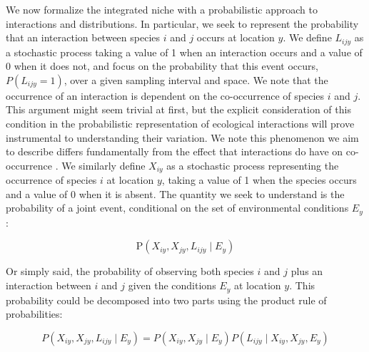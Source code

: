 \documentclass[12pt]{article}
\begin{document}
We now formalize the integrated niche with a probabilistic approach to
interactions and distributions. In particular, we seek to represent the
probability that an interaction between species $i$ and $j$ occurs at location
$y$. We define $L_{ijy}$ as a stochastic process taking a value of 1 when an
interaction occurs and a value of 0 when it does not, and focus on the
probability that this event occurs, $P(L_{ijy} = 1)$, over a given sampling
interval and space. We note that the occurrence of an interaction is dependent
on the co-occurrence of species $i$ and $j$. This argument might seem trivial
at first, but the explicit consideration of this condition in the
probabilistic representation of ecological interactions will prove
instrumental to understanding their variation. We note this phenomenon we aim
to describe differs fundamentally from the effect that interactions do have on
co-occurrence \citep{Cazelles2016}. We similarly define $X_{iy}$ as a
stochastic process representing the occurrence of species $i$ at location
$y$, taking a value of 1 when the species occurs and a value of 0 when it is
absent. The quantity we seek to understand is the probability of a joint
event, conditional on the set of environmental conditions $E_y$:

\begin{equation}
	\text{P}(X_{iy},X_{jy},L_{ijy}\mid E_y)
\end{equation}

Or simply said, the probability of observing both species $i$ and $j$ plus an
interaction between $i$ and $j$ given the conditions $E_y$ at location $y$.
This probability could be decomposed into two parts using the product rule of
probabilities:

\begin{equation}
	P(X_{iy},X_{jy},L_{ijy}\mid E_y)=P(X_{iy},X_{jy}\mid E_y)P(L_{ijy}\mid X_{iy},X_{jy},E_y)
\end{equation}
\end{document}
